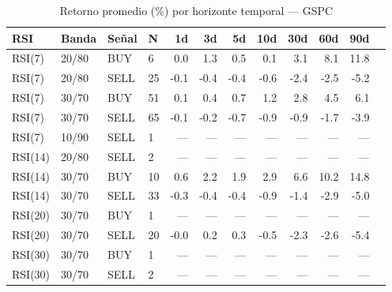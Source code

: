 %
\begin{table}[htbp]
    \centering
    \caption{Retorno promedio (\%) por horizonte temporal --- GSPC}
    \label{tab:media_gspc}
    \small
    \begin{tabular}{llllrrrrrrrr}
        \toprule
        \textbf{RSI} & \textbf{Banda} & \textbf{Se\~{n}al} & \textbf{N} & \textbf{1d} & \textbf{3d} & \textbf{5d} & \textbf{10d} & \textbf{30d} & \textbf{60d} & \textbf{90d} \\
        \midrule
        RSI(7) & 20/80 & BUY & 6 & 0.0 & 1.3 & 0.5 & 0.1 & 3.1 & 8.1 & 11.8 \\
        RSI(7) & 20/80 & SELL & 25 & -0.1 & -0.4 & -0.4 & -0.6 & -2.4 & -2.5 & -5.2 \\
        RSI(7) & 30/70 & BUY & 51 & 0.1 & 0.4 & 0.7 & 1.2 & 2.8 & 4.5 & 6.1 \\
        RSI(7) & 30/70 & SELL & 65 & -0.1 & -0.2 & -0.7 & -0.9 & -0.9 & -1.7 & -3.9 \\
        RSI(7) & 10/90 & SELL & 1 & --- & --- & --- & --- & --- & --- & --- \\
        \midrule
        RSI(14) & 20/80 & SELL & 2 & --- & --- & --- & --- & --- & --- & --- \\
        RSI(14) & 30/70 & BUY & 10 & 0.6 & 2.2 & 1.9 & 2.9 & 6.6 & 10.2 & 14.8 \\
        RSI(14) & 30/70 & SELL & 33 & -0.3 & -0.4 & -0.4 & -0.9 & -1.4 & -2.9 & -5.0 \\
        \midrule
        RSI(20) & 30/70 & BUY & 1 & --- & --- & --- & --- & --- & --- & --- \\
        RSI(20) & 30/70 & SELL & 20 & -0.0 & 0.2 & 0.3 & -0.5 & -2.3 & -2.6 & -5.4 \\
        \midrule
        RSI(30) & 30/70 & BUY & 1 & --- & --- & --- & --- & --- & --- & --- \\
        RSI(30) & 30/70 & SELL & 2 & --- & --- & --- & --- & --- & --- & --- \\
        \bottomrule
    \end{tabular}
\end{table}
